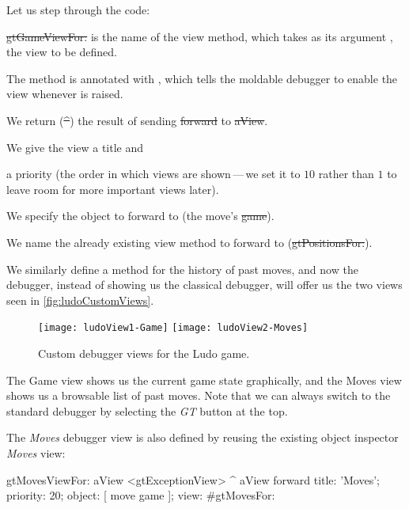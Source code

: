 \documentclass[sigplan,screen]{acmart} %
\newcommand\lmaf{\lst{Ludo\-Move\-Assert\-ion\-Fail\-ure}\xspace}
\begin{document}
Let us step through the code:
\begin{inparaenum}[(i)]
	\item \st{gtGameViewFor:} is the name of the view method, which takes as its argument , the view to be defined.
	\item The method is annotated with , which tells the moldable debugger to enable the view whenever \lmaf is raised.
	\item We return (\st{^}) the result of sending \st{forward} to \st{aView}.
	\item We give the view a title and
	\item a priority (the order in which views are shown\,---\,we set it to $10$ rather than $1$ to leave room for more important views later).
	\item We specify the object to forward to (the move's \st{game}).
	\item We name the already existing view method to forward to (\st{gtPositionsFor:}).
\end{inparaenum}

We similarly define a method for the history of past moves, and now the debugger, instead of showing us the classical debugger, will offer us the two views seen in \autoref{fig:ludoCustomViews}.
\begin{figure}[h]
  \texttt{[image: ludoView1-Game]}
  \texttt{[image: ludoView2-Moves]}
  \caption{Custom debugger views for the Ludo game.}
  \label{fig:ludoCustomViews}
\end{figure}
The Game view shows us the current game state graphically, and the Moves view shows us a browsable list of past moves.
Note that we can always switch to the standard debugger by selecting the \emph{GT} button at the top.

The \emph{Moves} debugger view is also defined by reusing the existing object inspector \emph{Moves} view:
\begin{code}
gtMovesViewFor: aView
	<gtExceptionView>
	^ aView forward
		title: 'Moves';
		priority: 20;
		object: [ move game ];
		view: #gtMovesFor:
\end{code}
\end{document}
